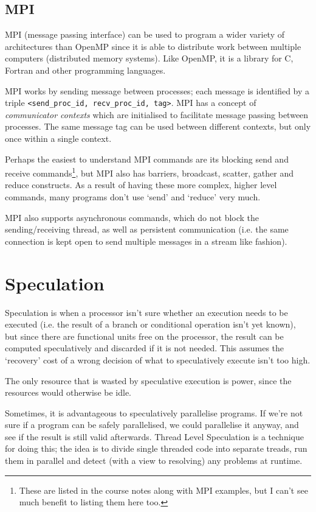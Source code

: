 \subsection{MPI}

MPI (message passing interface) can be used to program a wider variety of architectures than
OpenMP since it is able to distribute work between multiple computers
(distributed memory systems). Like OpenMP, it is a library for C,
Fortran and other programming languages.

MPI works by sending message between processes; each message is
identified by a triple \texttt{<send\_proc\_id, recv\_proc\_id,
tag>}. MPI has a concept of \textit{communicator contexts} which are
initialised to facilitate message passing between processes. The same
message tag can be used between different contexts, but only once
within a single context.

Perhaps the easiest to understand MPI commands are its blocking send
and receive commands\footnote{These are listed in the course notes
along with MPI examples, but I can't see much benefit to listing them
here too.}, but MPI also has barriers, broadcast, scatter, gather and
reduce constructs. As a result of having these more complex, higher
level commands, many programs don't use `send' and `reduce' very much.

MPI also supports asynchronous commands, which do not block the
sending/receiving thread, as well as persistent communication (i.e. the
same connection is kept open to send multiple messages in a stream
like fashion).


\section{Speculation}

Speculation is when a processor isn't sure whether an execution needs
to be executed (i.e. the result of a branch or conditional operation
isn't yet known), but since there are functional units free on the
processor, the result can be computed speculatively and discarded if
it is not needed. This assumes the `recovery' cost of a wrong decision
of what to speculatively execute isn't too high.

The only resource that is wasted by speculative execution is power,
since the resources would otherwise be idle.

Sometimes, it is advantageous to speculatively parallelise
programs. If we're not sure if a program can be safely parallelised,
we could parallelise it anyway, and see if the result is still valid
afterwards. Thread Level Speculation is a technique for doing this;
the idea is to divide single threaded code into separate treads, run
them in parallel and detect (with a view to resolving) any problems at
runtime.

